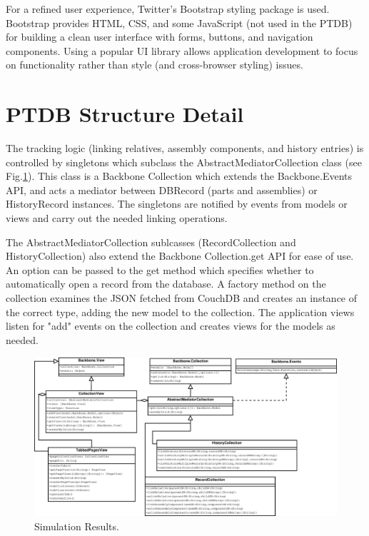 \documentclass[journal]{IEEEtran}
\begin{document}
For a refined user experience, Twitter's Bootstrap styling package is used. Bootstrap 
provides HTML, CSS, and some JavaScript (not used in the PTDB) for building a clean
user interface with forms, buttons, and navigation components. Using a popular UI 
library allows application development to focus on functionality rather than style (and
cross-browser styling) issues.

\section{PTDB Structure Detail}
The tracking logic (linking relatives, assembly components, and history entries) is controlled
by singletons which subclass the AbstractMediatorCollection class (see Fig.\ref{singletons}). This class is a Backbone Collection
which extends the Backbone.Events API, and acts a mediator between DBRecord (parts and assemblies) or
HistoryRecord instances. The singletons are notified by events from models or views and carry out the needed
linking operations.

The AbstractMediatorCollection sublcasses (RecordCollection and HistoryCollection) also extend the
Backbone Collection.get API for ease of use. An option can be passed to the get method which
specifies whether to automatically open a record from the database.
A factory method on the collection examines the JSON
fetched from CouchDB and creates an instance of the correct type, adding the new model
to the collection. The application views listen for "add" events on the collection and creates views
for the models as needed.

\begin{figure}[!p]
\centering
\includegraphics[width=7.5in]{Singletons}
\caption{Simulation Results.}
\label{singletons}
\end{figure}
\end{document}
